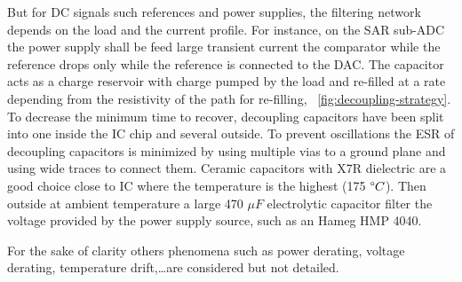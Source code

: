 But for DC signals such references and power supplies, the filtering network depends on the load and the current profile. For instance, on the SAR sub-ADC the power supply shall be feed large transient current the comparator while the reference drops only while the reference is connected to the DAC\@. The capacitor acts as a charge reservoir with charge pumped by the load and re-filled at a rate depending from the resistivity of the path for re-filling, \figurename~\ref{fig:decoupling-strategy}. To decrease the minimum time to recover, decoupling capacitors have been split into one inside the IC chip and several outside. To prevent oscillations the ESR of decoupling capacitors is minimized by using multiple vias to a ground plane and using wide traces to connect them. Ceramic capacitors with X7R dielectric are a good choice close to IC where the temperature is the highest (175 \(\degree C\)). Then outside at ambient temperature a large 470 \(\mu F\) electrolytic capacitor filter the voltage provided by the power supply source, such as an Hameg HMP 4040. 

For the sake of clarity others phenomena such as power derating, voltage derating, temperature drift,\ldots are considered but not detailed.
